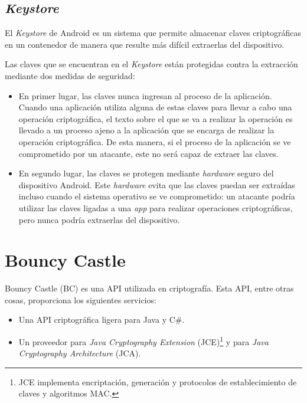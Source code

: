 \subsection{\emph{Keystore}}

\label{Keystore}

El \emph{Keystore} de Android es un sistema que permite almacenar claves criptográficas en un contenedor de manera que resulte más difícil extraerlas del dispositivo.

Las claves que se encuentran en el \emph{Keystore} están protegidas contra la extracción mediante dos medidas de seguridad:

\begin{itemize}
  \item En primer lugar, las claves nunca ingresan al proceso de la aplicación. Cuando una aplicación utiliza alguna de estas claves para llevar a cabo una operación criptográfica, el texto sobre el que se va a realizar la operación es llevado a un proceso ajeno a la aplicación que se encarga de realizar la operación criptográfica. De esta manera, si el proceso de la aplicación se ve comprometido por un atacante, este no será capaz de extraer las claves.

  \item En segundo lugar, las claves se protegen mediante \emph{hardware} seguro del dispositivo Android. Este \emph{hardware} evita que las claves puedan ser extraídas incluso cuando el sistema operativo se ve comprometido: un atacante podría utilizar las claves ligadas a una \emph{app} para realizar operaciones criptográficas, pero nunca podría extraerlas del dispositivo.
\end{itemize}

\emph{\parencite{Reference33}}


\section{Bouncy Castle}

Bouncy Castle (BC) es una API utilizada en criptografía. Esta API, entre otras cosas, proporciona los siguientes servicios:
\begin{itemize}
  \item Una API criptográfica ligera para Java y C\#.
  \item Un proveedor para \emph{Java Cryptography Extension} (JCE)\footnote{JCE implementa encriptación, generación y protocolos de establecimiento de claves y algoritmos MAC.} y para \emph{Java Cryptography Architecture} (JCA).
\end{itemize}

